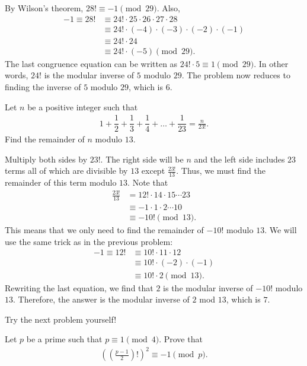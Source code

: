 \documentclass{subfile}
\begin{document}
		\begin{solution}
			By Wilson's theorem, $28! \equiv -1 \pmod{29}$. Also,
				\begin{align*}
					-1 \equiv 28! &\equiv 24! \cdot 25 \cdot 26 \cdot 27 \cdot 28\\
					    &\equiv 24! \cdot (-4) \cdot (-3) \cdot (-2) \cdot (-1)\\
					    &\equiv 24! \cdot 24\\
					    &\equiv 24! \cdot (-5)\pmod{29}.
				\end{align*}
			The last congruence equation can be written as $24! \cdot 5 \equiv 1 \pmod{29}$. In other words, $24!$ is the modular inverse of $5$ modulo $29$. The problem now reduces to finding the inverse of $5$ modulo $29$, which is $6$.

		\end{solution}

		\begin{problem}
			Let $n$ be a positive integer such that
				\begin{align*}
					1 + \dfrac{1}{2} + \dfrac{1}{3} + \dfrac{1}{4} +\ldots + \dfrac{1}{23} = \frac{n}{23!}.
				\end{align*}
			Find the remainder of $n$ modulo $13$.
		\end{problem}

		\begin{solution}
			Multiply both sides by $23!$. The right side will be $n$ and the left side includes $23$ terms all of which are divisible by $13$ except $\frac{23!}{13}$. Thus, we must find the remainder of this term modulo $13$. Note that
				\begin{align*}
					\frac{23!}{13} &= 12! \cdot 14 \cdot 15 \cdots 23\\
								   &\equiv -1 \cdot 1 \cdot 2 \cdots 10\\
								   &\equiv -10! \pmod{13}.
				\end{align*}
			This means that we only need to find the remainder of $-10!$ modulo $13$. We will use the same trick as in the previous problem:
				\begin{align*}
					-1 \equiv 12! &\equiv 10! \cdot 11 \cdot 12\\
						&\equiv 10! \cdot (-2) \cdot (-1)\\
						&\equiv 10! \cdot 2\pmod{13}.
				\end{align*}
			Rewriting the last equation, we find that $2$ is the modular inverse of $-10!$ modulo $13$. Therefore, the answer is the modular inverse of $2$ mod $13$, which is $7$.
		\end{solution}
	Try the next problem yourself!
		\begin{problem}
			Let $p$ be a prime such that $p \equiv 1 \pmod 4$. Prove that
				\begin{align*}
					\left(\left(\frac{p-1}{2}\right)!\right)^2 \equiv -1 \pmod p.
				\end{align*}
		\end{problem}
\end{document}
